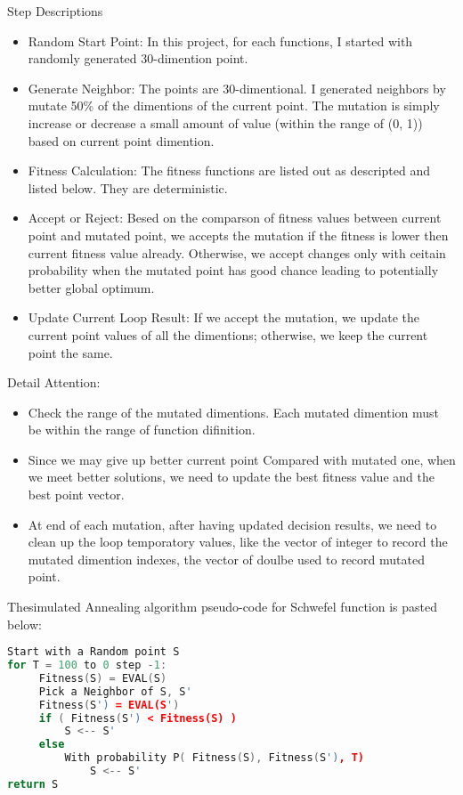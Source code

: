 \documentclass{article}
\begin{document}
\begin{CJK}{UTF8}{gbsn}
\begin{description}
\item Step Descriptions
  \begin{itemize}
    \itemsep=-3pt
  \item Random Start Point: In this project, for each functions, I started with randomly generated 30-dimention point. 
  \item Generate Neighbor: The points are 30-dimentional. I generated neighbors by mutate 50\% of the dimentions of the current point. The mutation is simply increase or decrease a small amount of value (within the range of (0, 1)) based on current point dimention. 
  \item Fitness Calculation: The fitness functions are listed out as descripted and listed below. They are deterministic. 
  \item Accept or Reject: Besed on the comparson of fitness values between current point and mutated point, we accepts the mutation if the fitness is lower then current fitness value already. Otherwise, we accept changes only with ceitain probability when the mutated point has good chance leading to potentially better global optimum.
  \item Update Current Loop Result: If we accept the mutation, we update the current point values of all the dimentions; otherwise, we keep the current point the same.
  \end{itemize}

\item Detail Attention: 
  \begin{itemize}
    \itemsep=-3pt
  \item Check the range of the mutated dimentions. Each mutated dimention must be within the range of function difinition. 
  \item Since we may give up better current point Compared with mutated one, when we meet better solutions, we need to update the best fitness value and the best point vector. 
  \item At end of each mutation, after having updated decision results, we need to clean up the loop temporatory values, like the vector of integer to record the mutated dimention indexes, the vector of doulbe used to record mutated point. 
  \end{itemize}
\end{description}

Thesimulated Annealing algorithm pseudo-code for Schwefel function is pasted below: 
\begin{lstlisting}[language=c++]
Start with a Random point S
for T = 100 to 0 step -1:
     Fitness(S) = EVAL(S)
     Pick a Neighbor of S, S'
     Fitness(S') = EVAL(S')
     if ( Fitness(S') < Fitness(S) )
         S <-- S'
     else
         With probability P( Fitness(S), Fitness(S'), T)
             S <-- S'
return S
\end{lstlisting}



\end{CJK}
\end{document}
